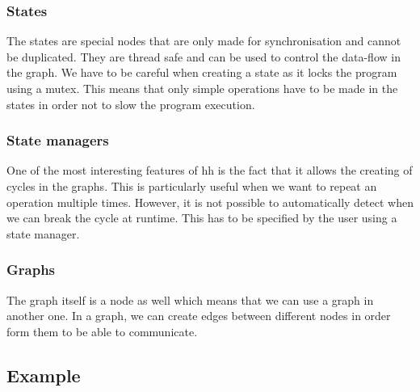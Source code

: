 \subsubsection{States}

The states are special nodes that are only made for synchronisation and cannot
be duplicated. They are thread safe and can be used to control the data-flow in
the graph. We have to be careful when creating a state as it locks the program
using a mutex. This means that only simple operations have to be made in the
states in order not to slow the program execution.


\subsubsection{State managers}

One of the most interesting features of \gls{hh} is the fact that it allows the
creating of cycles in the graphs. This is particularly useful when we want to
repeat an operation multiple times. However, it is not possible to automatically
detect when we can break the cycle at runtime. This has to be specified by the
user using a state manager.



\subsubsection{Graphs}

The graph itself is a node as well which means that we can use a graph in
another one. In a graph, we can create edges between different nodes in order
form them to be able to communicate.


\subsection{Example}
